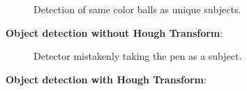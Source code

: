 \documentclass{sciposter}
\begin{document}
\begin{multicols}{3}
\begin{figure}[!h]
	\centering
			\setlength{\fboxsep}{1pt}
			\setlength{\fboxrule}{1pt}
	\caption{Detection of same color balls as unique subjects.}
	\label{fig:same_color}
\end{figure}

\textbf{Object detection without Hough Transform}:

\begin{figure}[!h]
	\centering
			\setlength{\fboxsep}{1pt}
			\setlength{\fboxrule}{1pt}
	\caption{Detector mistakenly taking the pen as a subject.}
	\label{fig:not_hough}
\end{figure}

\textbf{Object detection with Hough Transform}:


\end{multicols}
\end{document}
